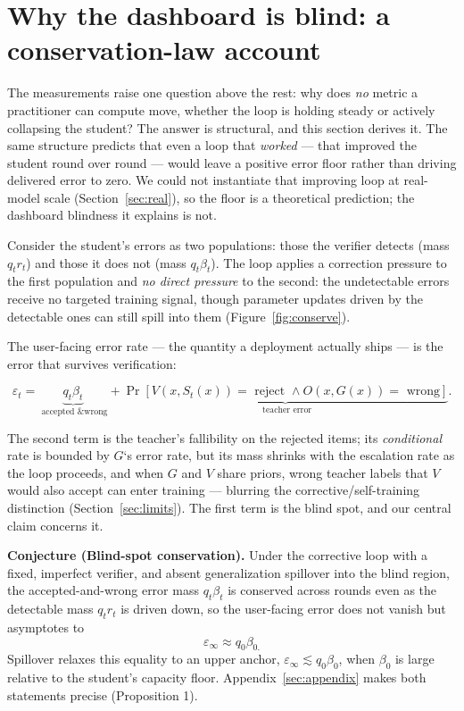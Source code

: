 \documentclass[11pt]{article}
\begin{document}
\section{Why the dashboard is blind: a conservation-law account}

\protect{}\label{sec:law}{}

The measurements raise one question above the rest: why does \emph{no}
metric a practitioner can compute move, whether the loop is holding
steady or actively collapsing the student? The answer is structural, and
this section derives it. The same structure predicts that even a loop
that \emph{worked} --- that improved the student round over round ---
would leave a positive error floor rather than driving delivered error
to zero. We could not instantiate that improving loop at real-model
scale (Section~\ref{sec:real}), so the floor is a theoretical prediction;
the dashboard blindness it explains is not.

Consider the student's errors as two populations: those the verifier
detects (mass \(q_{t}r_{t}\)) and those it does not (mass
\(q_{t}\beta_{t}\)). The loop applies a correction pressure to the first
population and \emph{no direct pressure} to the second: the undetectable
errors receive no targeted training signal, though parameter updates
driven by the detectable ones can still spill into them
(Figure~\ref{fig:conserve}).

The user-facing error rate --- the quantity a deployment actually ships
--- is the error that survives verification:

\[\varepsilon_{t} = \underset{\text{ accepted \& wrong}}{\underbrace{q_{t}\beta_{t}}} + \underset{\text{ teacher error}}{\underbrace{\Pr\left\lbrack V\left( x,S_{t}(x) \right) = \text{ reject } \land O\left( x,G(x) \right) = \text{ wrong} \right\rbrack}}.\]

The second term is the teacher's fallibility on the rejected items; its
\emph{conditional} rate is bounded by \(G\)`s error rate, but its mass
shrinks with the escalation rate as the loop proceeds, and when \(G\)
and \(V\) share priors, wrong teacher labels that \(V\) would also
accept can enter training --- blurring the corrective/self-training
distinction (Section~\ref{sec:limits}). The first term is the blind spot,
and our central claim concerns it.

\textbf{Conjecture (Blind-spot conservation).} Under the corrective loop
with a fixed, imperfect verifier, and absent generalization spillover
into the blind region, the accepted-and-wrong error mass
\(q_{t}\beta_{t}\) is conserved across rounds even as the detectable
mass \(q_{t}r_{t}\) is driven down, so the user-facing error does not
vanish but asymptotes to
\[\varepsilon_{\infty} \approx q_{0}\beta_{0.}\] Spillover relaxes this
equality to an upper anchor,
\(\varepsilon_{\infty} \lesssim q_{0}\beta_{0}\), when \(\beta_{0}\) is
large relative to the student's capacity floor.
Appendix~\ref{sec:appendix} makes both statements precise (Proposition 1).
\end{document}
